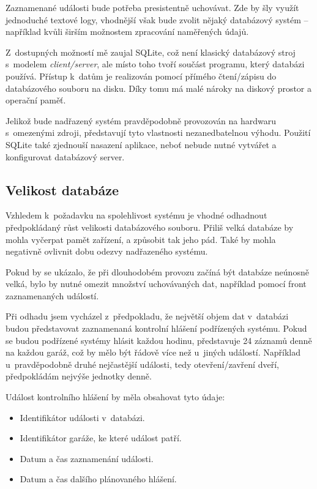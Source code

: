 Zaznamenané události bude potřeba presistentně uchovávat. Zde by šly využít jednoduché textové logy, vhodnější však bude zvolit nějaký databázový systém -- například kvůli širším možnostem zpracování naměřených údajů.

Z~dostupných možností mě zaujal SQLite, což není klasický databázový stroj s~modelem \textit{client/server}, ale místo toho tvoří součást programu, který databázi používá. Přístup k~datům je realizován pomocí přímého čtení/zápisu do databázového souboru na disku.  Díky tomu má malé nároky na diskový prostor a operační paměť. \cite{sqlite_about}

Jelikož bude nadřazený systém pravděpodobně provozován na hardwaru s~omezenými zdroji, představují tyto vlastnosti nezanedbatelnou výhodu. Použití SQLite také zjednouší nasazení aplikace, neboť nebude nutné vytvářet a konfigurovat databázový server.

\subsection{Velikost databáze}

Vzhledem k~požadavku na spolehlivost systému je vhodné odhadnout předpokládaný růst velikosti databázového souboru. Přiliš velká databáze by mohla vyčerpat pamět zařízení, a způsobit tak jeho pád. Také by mohla negativně ovlivnit dobu odezvy nadřazeného systému.

Pokud by se ukázalo, že při dlouhodobém provozu začíná být databáze neúnosně velká, bylo by nutné omezit množství uchovávaných dat, například pomocí front zaznamenaných událostí.

Při odhadu jsem vycházel z~předpokladu, že největší objem dat v~databázi budou představovat zaznamenaná kontrolní hlášení podřízených systému. Pokud se budou podřízené systémy hlásit každou hodinu, představuje 24 záznamů denně na každou garáž, což by mělo být řádově více než u~jiných událostí. Například u~pravděpodobně druhé nejčastější události, tedy otevření/zavření dveří, předpokládám nejvýše jednotky denně.

Událost kontrolního hlášení by měla obsahovat tyto údaje:

\begin{itemize}
    \item Identifikátor události v~databázi.
    \item Identifikátor garáže, ke které událost patří.
    \item Datum a čas zaznamenání události.
    \item Datum a čas dalšího plánovaného hlášení.
\end{itemize}

